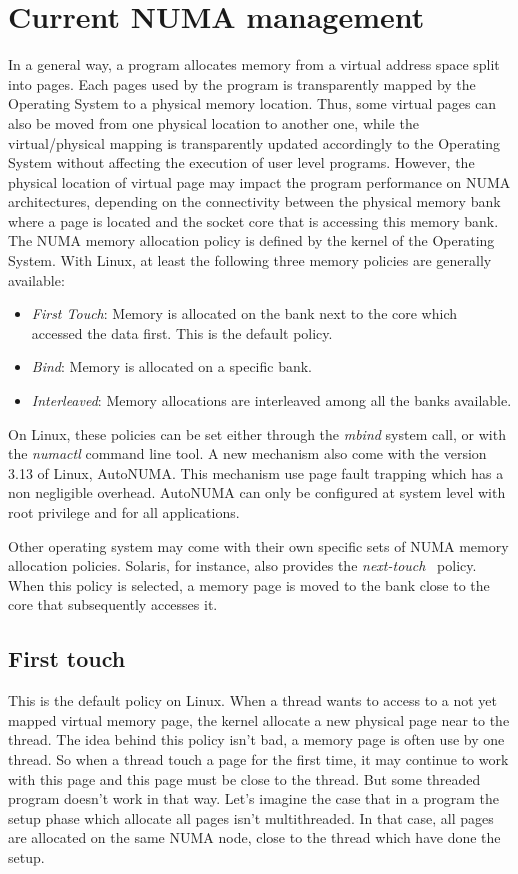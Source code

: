\section{Current NUMA management}
In a general way, a program allocates memory from a virtual address space split into pages.
%
Each pages used by the program is transparently mapped by the Operating System to a physical memory location.
%
Thus, some virtual pages can also be moved from one physical location to another one, while the virtual/physical mapping is transparently updated accordingly to the Operating System without affecting the execution of user level programs.
%
However, the physical location of virtual page may impact the program performance on NUMA architectures, depending on the connectivity between the physical memory bank where a page is located and the socket core that is accessing this memory bank.
%
The NUMA memory allocation policy is defined by the kernel of the Operating System.
%
With Linux, at least the following three memory policies are generally available:
\begin{itemize}
        \item {\em First Touch}: Memory is allocated on the bank next to the core which accessed the data first.
                         This is the default policy.
        \item {\em Bind}: Memory is allocated on a specific bank.
        \item {\em Interleaved}: Memory allocations are interleaved among all the banks available.
\end{itemize}
On Linux, these policies can be set either through the \textit{mbind} system call, or with the {\em numactl} command line tool.
%
A new mechanism also come with the version 3.13 of Linux, AutoNUMA.
%
This mechanism use page fault trapping which has a non negligible overhead.
%
AutoNUMA can only be configured at system level with root privilege and for all applications.


Other operating system may come with their own specific sets of NUMA memory allocation policies.
%
Solaris, for instance, also provides the \textit{next-touch}~\cite{next_touch} policy.
%
When this policy is selected, a memory page is moved to the bank close to the core that subsequently accesses it.


\subsection{First touch}
This is the default policy on Linux.
%
When a thread wants to access to a not yet mapped virtual memory page, the kernel allocate a new physical page near to the thread.
%
The idea behind this policy isn't bad, a memory page is often use by one thread.
%
So when a thread touch a page for the first time, it may continue to work with this page and this page must be close to the thread.
%
But some threaded program doesn't work in that way.
%
Let's imagine the case that in a program the setup phase which allocate all pages isn't multithreaded.
%
In that case, all pages are allocated on the same NUMA node, close to the thread which have done the setup.


